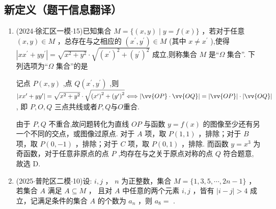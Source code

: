\subsection*{新定义（题干信息翻译）}
\begin{enumerate}

    \item (2024$\cdot$徐汇区一模$\cdot$15)已知集合 $M = \{ \left( {x,y}\right)  \mid  y = f\left( x\right) \}$ ，若对于任意 $\left( {x,y}\right)  \in  M$ ，总存在与之相应的 $\left( {{x}^{\prime },{y}^{\prime }}\right)  \in  M$ (其中 $x \neq  {x}^{\prime }$ ),使得 $\left| {x{x}^{\prime } + y{y}^{\prime }}\right|  = \sqrt{{x}^{2} + {y}^{2}} \cdot  \sqrt{{\left( {x}^{\prime }\right) }^{2} + {\left( {y}^{\prime }\right) }^{2}}$ 成立,则称集合 $M$ 是“$\Omega$ 集合”. 下列选项为“$\Omega$ 集合”的是 
    \begin{jieda}
        记点 $P\left( {x,y}\right)$ ,点 $Q\left( {{x}^{\prime },{y}^{\prime }}\right)$ ,则 $\left| {x{x}^{\prime } + y{y}^{\prime }}\right|  = \sqrt{{x}^{2} + {y}^{2}} \cdot  \sqrt{{\left( {x}^{\prime }\right) }^{2} + {\left( {y}^{\prime }\right) }^{2}} \Longleftrightarrow  \left| {\vv{OP} \cdot  \vv{OQ}}\right|  = \left| \vv{OP}\right|  \cdot  \left| \vv{OQ}\right|$, 即 $P,O,Q$ 三点共线或者$P,Q$与$O$重合.
        
        由于 $P,Q$ 不重合,故问题转化为直线 ${OP}$ 与函数 $y = f\left( x\right)$ 的图像至少还有另一个不同的交点，或图像过原点. 对于 ${A}$ 项，取 $P\left( {1,1}\right)$ ，排除；对于 ${B}$ 项，取 $P\left( {0, - 1}\right)$ ，排除；对于 $C$ 项，取 $P\left( {0,1}\right)$ ，排除. 而函数 $y = {x}^{3}$ 为奇函数，对于任意非原点的点 $P$ ,均存在与之关于原点对称的点 $Q$ 符合题意,故选 D.
    \end{jieda}
    \item (2025$\cdot$普陀区二模$\cdot$10)设: ${i,j}$ ， $n$ 为正整数，集合 $M = \{ 1,3,5,\cdots ,{{2n} - 1}\}$ ，若集合 $A$ 满足 $A \subseteq  M$ ， 且对 $A$ 中任意的两个元素 $i,j$ ，皆有 $\left| {i - j}\right|  > 4$ 成立，记满足条件的集合 $A$ 的个数为 ${a}_{n}$ ，则 ${a}_{8} =$ .
    \begin{jieda}
\end{jieda}
\end{enumerate}
